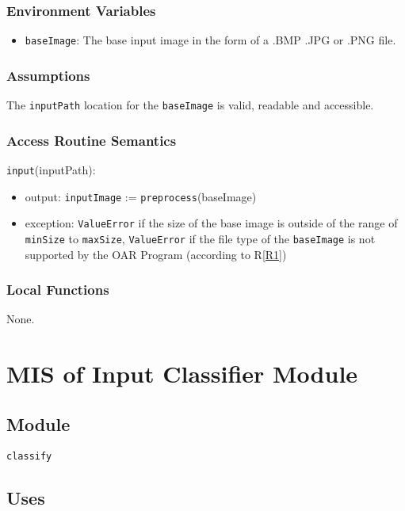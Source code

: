 \documentclass[12pt, titlepage]{article}
\def\code#1{\texttt{#1}}
\begin{document}
\subsubsection{Environment Variables}

\begin{itemize}
  \item \code{baseImage}: The base input image in the form of a .BMP .JPG or .PNG file.
\end{itemize}

\subsubsection{Assumptions}

The \code{inputPath} location for the \code{baseImage} is valid, readable and accessible.

\subsubsection{Access Routine Semantics}

\noindent \code{input}(inputPath):
\begin{itemize}
\item output: \code{inputImage} := \code{preprocess}(baseImage) 
\item exception: \code{ValueError} if the size of the base image is outside of the range of 
\code{minSize} to \code{maxSize}, \code{ValueError} if the file type of the \code{baseImage} is not 
supported by the OAR Program (according to R\ref{R1})
\end{itemize}

\subsubsection{Local Functions}

None.


\section{MIS of Input Classifier Module} \label{ModuleIC} 

\subsection{Module}

\code{classify}

\subsection{Uses}
\end{document}
